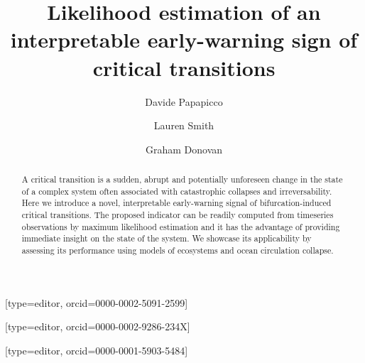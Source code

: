 \documentclass[a4paper,fleqn]{cas-sc}
\begin{document}
\let\WriteBookmarks\relax
\def\floatpagepagefraction{1}
\def\textpagefraction{.001}
\shorttitle{}

\title[mode = title]{Likelihood estimation of an interpretable early-warning sign of critical transitions}

\author[1]{Davide Papapicco}[type=editor, orcid=0000-0002-5091-2599]

\author[1]{Lauren Smith}[type=editor, orcid=0000-0002-9286-234X]

\author[1]{Graham Donovan}[type=editor, orcid=0000-0001-5903-5484]

\cormark[1]


\begin{abstract}
        A critical transition is a sudden, abrupt and potentially unforeseen change in the state of a complex system often associated with catastrophic collapses and irreversability.
        Here we introduce a novel, interpretable early-warning signal of bifurcation-induced critical transitions.
        The proposed indicator can be readily computed from timeseries observations by maximum likelihood estimation and it has the advantage of providing immediate insight on the state of the system.
        We showcase its applicability by assessing its performance using models of ecosystems and ocean circulation collapse.
\end{abstract}
\end{document}
